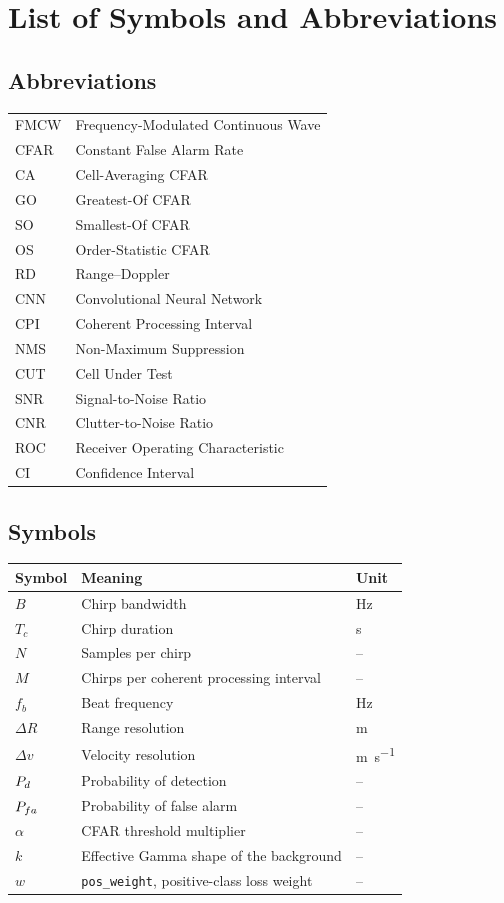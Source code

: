 \chapter*{List of Symbols and Abbreviations}

\section*{Abbreviations}

\begin{tabular}{@{}ll@{}}
\toprule
FMCW & Frequency-Modulated Continuous Wave \\
CFAR & Constant False Alarm Rate \\
CA & Cell-Averaging CFAR \\
GO & Greatest-Of CFAR \\
SO & Smallest-Of CFAR \\
OS & Order-Statistic CFAR \\
RD & Range--Doppler \\
CNN & Convolutional Neural Network \\
CPI & Coherent Processing Interval \\
NMS & Non-Maximum Suppression \\
CUT & Cell Under Test \\
SNR & Signal-to-Noise Ratio \\
CNR & Clutter-to-Noise Ratio \\
ROC & Receiver Operating Characteristic \\
CI & Confidence Interval \\
\bottomrule
\end{tabular}

\vspace{1cm}

\section*{Symbols}

\begin{tabular}{@{}lll@{}}
\toprule
Symbol & Meaning & Unit \\
\midrule
$B$ & Chirp bandwidth & \si{\hertz} \\
$T_c$ & Chirp duration & \si{\second} \\
$N$ & Samples per chirp & -- \\
$M$ & Chirps per coherent processing interval & -- \\
$f_b$ & Beat frequency & \si{\hertz} \\
$\Delta R$ & Range resolution & \si{\metre} \\
$\Delta v$ & Velocity resolution & \si{\metre\per\second} \\
$P_{d}$ & Probability of detection & -- \\
$P_{fa}$ & Probability of false alarm & -- \\
$\alpha$ & CFAR threshold multiplier & -- \\
$k$ & Effective Gamma shape of the background & -- \\
$w$ & \texttt{pos\_weight}, positive-class loss weight & -- \\
\bottomrule
\end{tabular}
